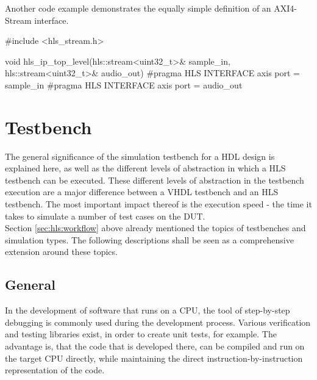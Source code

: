 Another code example demonstrates the equally simple definition of an AXI4-Stream interface.

\begin{CppCode}
  #include <hls_stream.h>

  void hls_ip_top_level(hls::stream<uint32_t>& sample_in,
                        hls::stream<uint32_t>& audio_out) {
      #pragma HLS INTERFACE axis port = sample_in
      #pragma HLS INTERFACE axis port = audio_out
  }
\end{CppCode}

\section{Testbench}

The general significance of the simulation testbench for a HDL design is explained here, as well as the different levels of abstraction in which a HLS testbench can be executed.
These different levels of abstraction in the testbench execution are a major difference between a VHDL testbench and an HLS testbench.
The most important impact thereof is the execution speed - the time it takes to simulate a number of test cases on the DUT.\\

Section \ref{sec:hls:workflow} above already mentioned the topics of testbenches and simulation types.
The following descriptions shall be seen as a comprehensive extension around these topics.

\subsection{General}
\label{sub:hls:testbench:general}

In the development of software that runs on a CPU, the tool of step-by-step debugging is commonly used during the development process.
Various verification and testing libraries exist, in order to create unit tests, for example.
The advantage is, that the code that is developed there, can be compiled and run on the target CPU directly, while maintaining the direct instruction-by-instruction representation of the code.\\

